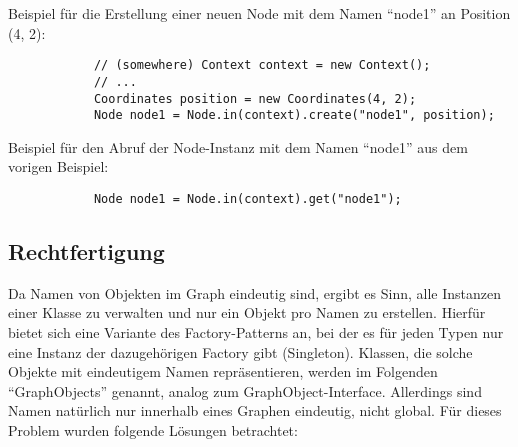 \documentclass[accentcolor=tud0b,12pt,paper=a4]{tudreport}
\begin{document}
			Beispiel für die Erstellung einer neuen Node mit dem Namen "`node1"' an Position (4, 2):\\
			\begin{lstlisting}
			// (somewhere) Context context = new Context();
			// ...
			Coordinates position = new Coordinates(4, 2);
			Node node1 = Node.in(context).create("node1", position);		
			\end{lstlisting}
			
			Beispiel für den Abruf der Node-Instanz mit dem Namen "`node1"' aus dem vorigen Beispiel:\\
			\begin{lstlisting}	
			Node node1 = Node.in(context).get("node1");
			\end{lstlisting}
		
		\subsection{Rechtfertigung}
			Da Namen von Objekten im Graph eindeutig sind, ergibt es Sinn, alle Instanzen einer Klasse zu verwalten und nur ein Objekt pro Namen zu erstellen. Hierfür bietet sich eine Variante des Factory-Patterns an, bei der es für jeden Typen nur eine Instanz der dazugehörigen Factory gibt (Singleton).
			Klassen, die solche Objekte mit eindeutigem Namen repräsentieren, werden im Folgenden "`GraphObjects"' genannt, analog zum GraphObject-Interface.
			Allerdings sind Namen natürlich nur innerhalb eines Graphen eindeutig, nicht global. Für dieses Problem wurden folgende Lösungen betrachtet:
\end{document}
